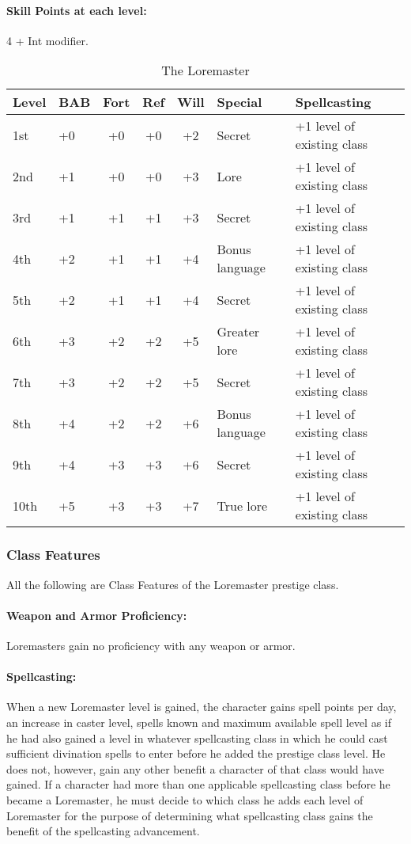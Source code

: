 \paragraph{Skill Points at each level:} 4 + Int modifier.
\begin{table*}
\centering
\caption{The Loremaster}
\label{tab:Loremaster}
\begin{tabular}{|l|l|c|c|c|l|l|}
\hline
\textbf{Level}&\textbf{BAB}&\textbf{Fort}&\textbf{Ref}&\textbf{Will}&\textbf{Special}&\textbf{Spellcasting}\\
\hline
1st	&+0	&+0	&+0	&+2	&Secret		&+1 level of existing class\\
2nd	&+1	&+0	&+0	&+3	&Lore		&+1 level of existing class\\
3rd	&+1	&+1	&+1	&+3	&Secret		&+1 level of existing class\\
4th	&+2	&+1	&+1	&+4	&Bonus language	&+1 level of existing class\\
5th	&+2	&+1	&+1	&+4	&Secret		&+1 level of existing class\\
6th	&+3	&+2	&+2	&+5	&Greater lore	&+1 level of existing class\\
7th	&+3	&+2	&+2	&+5	&Secret		&+1 level of existing class\\
8th	&+4	&+2	&+2	&+6	&Bonus language	&+1 level of existing class\\
9th	&+4	&+3	&+3	&+6	&Secret		&+1 level of existing class\\
10th	&+5	&+3	&+3	&+7	&True lore	&+1 level of existing class\\
\hline
\end{tabular}
\end{table*}
\subsubsection{Class Features}
All the following are Class Features of the Loremaster prestige class.

\paragraph{Weapon and Armor Proficiency:} Loremasters gain no proficiency with any weapon or armor.

\paragraph{Spellcasting:} When a new Loremaster level is gained, the character gains spell points per day, an increase in caster level, spells known and maximum available spell level as if he had also gained a level in whatever spellcasting class in which he could cast sufficient divination spells to enter before he added the prestige class level. 
He does not, however, gain any other benefit a character of that class would have gained. 
If a character had more than one applicable spellcasting class before he became a Loremaster, 
he must decide to which class he adds each level of Loremaster for the purpose of determining what spellcasting class gains the benefit of the spellcasting advancement.

